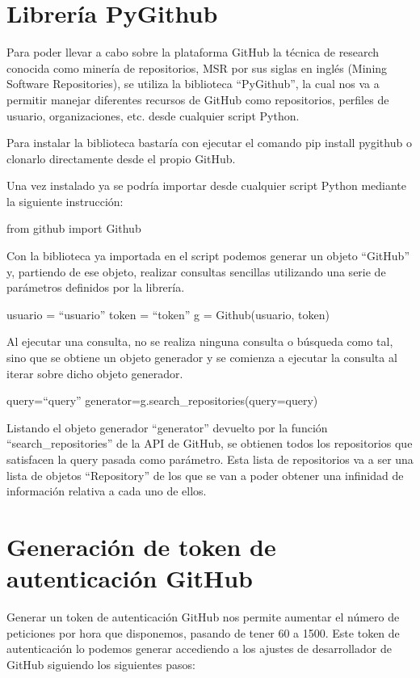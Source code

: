 \section{Librería PyGithub}

Para poder llevar a cabo sobre la plataforma GitHub la técnica de research conocida como minería de repositorios, MSR por sus siglas en inglés (Mining Software Repositories), se utiliza la biblioteca ``PyGithub'', la cual nos va a permitir manejar diferentes recursos de GitHub como repositorios, perfiles de usuario, organizaciones, etc. desde cualquier script Python.

Para instalar la biblioteca bastaría con ejecutar el comando pip install pygithub o clonarlo directamente desde el propio GitHub.

Una vez instalado ya se podría importar desde cualquier script Python mediante la siguiente instrucción:

from github import Github

Con la biblioteca ya importada en el script podemos generar un objeto ``GitHub'' y, partiendo de ese objeto, realizar consultas sencillas utilizando una serie de parámetros definidos por la librería.

usuario = ``\<usuario\>'' 
token = ``\<token\>''
g = Github(usuario, token)

Al ejecutar una consulta, no se realiza ninguna consulta o búsqueda como tal, sino que se obtiene un objeto generador y se comienza a ejecutar la consulta al iterar sobre dicho objeto generador.

query=``\<query\>'' 
generator=g.search\_repositories(query=query)

Listando el objeto generador “generator” devuelto por la función ``search\_repositories'' de la API de GitHub, se obtienen todos los repositorios que satisfacen la query pasada como parámetro. Esta lista de repositorios va a ser una lista de objetos “Repository” de los que se van a poder obtener una infinidad de información relativa a cada uno de ellos.

\section{Generación de token de autenticación GitHub}

Generar un token de autenticación GitHub nos permite aumentar el número de peticiones por hora que disponemos, pasando de tener 60 a 1500.
Este token de autenticación lo podemos generar accediendo a los ajustes de desarrollador de GitHub siguiendo los siguientes pasos:

